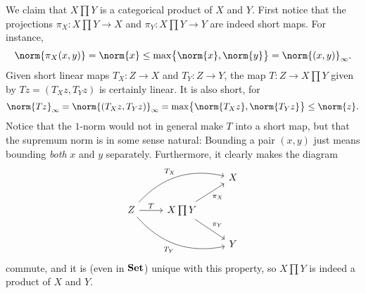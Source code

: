 \documentclass[article, a4paper, 11pt, oneside]{memoir}
\numberwithin{equation}{chapter}
\theoremstyle{nonumberplain}
\begin{document}
\begin{remarkbreak}
	We claim that $X \prod Y$ is a categorical product of $X$ and $Y$. First notice that the projections $\pi_X \colon X \prod Y \to X$ and $\pi_Y \colon X \prod Y \to Y$ are indeed short maps. For instance,
	\begin{equation*}
		\norm{\pi_X(x,y)}
			= \norm{x}
			\leq \max \bigl\{ \norm{x}, \norm{y} \bigr\}
			= \norm{(x,y)}_\infty.
	\end{equation*}
	Given short linear maps $T_X \colon Z \to X$ and $T_Y \colon Z \to Y$, the map $T \colon Z \to X \prod Y$ given by $Tz = (T_X z, T_Y z)$ is certainly linear. It is also short, for
	\begin{equation*}
		\norm{Tz}_\infty
			= \norm{(T_X z, T_Y z)}_\infty
			= \max \bigl\{ \norm{T_X z}, \norm{T_Y z} \bigr\}
			\leq \norm{z}.
	\end{equation*}
	Notice that the $1$-norm would not in general make $T$ into a short map, but that the supremum norm is in some sense natural: Bounding a pair $(x,y)$ just means bounding \emph{both} $x$ and $y$ separately. Furthermore, it clearly makes the diagram
	\begin{equation*}
        \begin{tikzcd}
            && X \\
            Z
                \ar[r, "T"]
                \ar[urr, "T_X", bend left]
                \ar[drr, "T_Y", bend right, swap]
            & X \prod Y
                \ar[ur, "\pi_X", swap]
                \ar[dr, "\pi_Y"] \\
            && Y
        \end{tikzcd}
    \end{equation*}
	commute, and it is (even in $\mathbf{Set}$) unique with this property, so $X \prod Y$ is indeed a product of $X$ and $Y$.


\end{remarkbreak}
\end{document}
